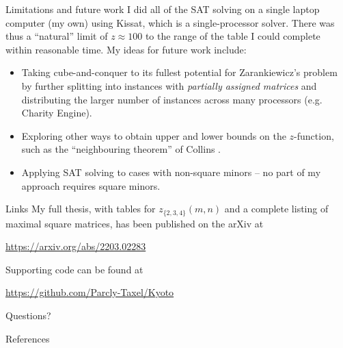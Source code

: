 \documentclass[10pt]{beamer}
\begin{document}
\begin{frame}{Limitations and future work}
    I did all of the SAT solving on a single laptop computer (my own) using Kissat, which is a single-processor solver. There was thus a ``natural'' limit of $z\approx100$ to the range of the table I could complete within reasonable time. My ideas for future work include:
    \begin{itemize}
        \item Taking cube-and-conquer to its fullest potential for Zarankiewicz's problem by further splitting into instances with \textit{partially assigned matrices} and distributing the larger number of instances across many processors (e.g. Charity Engine).
        \item Exploring other ways to obtain upper and lower bounds on the $z$-function, such as the ``neighbouring theorem'' of Collins \cite{collins}.
        \item Applying SAT solving to cases with non-square minors -- no part of my approach requires square minors.
    \end{itemize}
\end{frame}

\begin{frame}{Links}
  My full thesis, with tables for $z_{\{2,3,4\}}(m,n)$ and a complete listing of maximal square matrices, has been published on the arXiv at
  \begin{center}
    \url{https://arxiv.org/abs/2203.02283}
  \end{center}
  Supporting code can be found at
  \begin{center}
    \url{https://github.com/Parcly-Taxel/Kyoto}
  \end{center}
\end{frame}

{
\begin{frame}[standout]
  Questions?
\end{frame}
}

\appendix
\begin{frame}[allowframebreaks]{References}
  
  
\end{frame}
\end{document}
